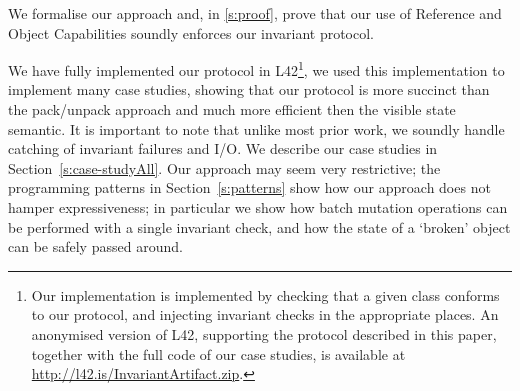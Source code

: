 We formalise our approach and, in \ref{s:proof}, prove that our use of Reference and Object Capabilities soundly enforces our invariant protocol.

We have fully implemented our protocol in L42\footnote{
Our implementation is implemented by checking that a given class conforms to our protocol, and injecting invariant checks in the appropriate places.
An anonymised version of L42, supporting the protocol described in this paper, together with the full code of our case studies, is available at \url{http://l42.is/InvariantArtifact.zip}. %
}, we used this implementation to implement many case studies, showing that our protocol is more succinct than the pack/unpack approach and much more efficient then the visible state semantic.
It is important to note that unlike most prior work, we soundly handle catching of invariant failures and I/O.
We describe our case studies in Section~\ref{s:case-studyAll}.
Our approach may seem very restrictive;
the programming patterns in Section~\ref{s:patterns} show how our approach does not hamper expressiveness; in particular we show how batch mutation operations can be performed with a single invariant check, and how the state of a `broken' object can be safely passed around.




